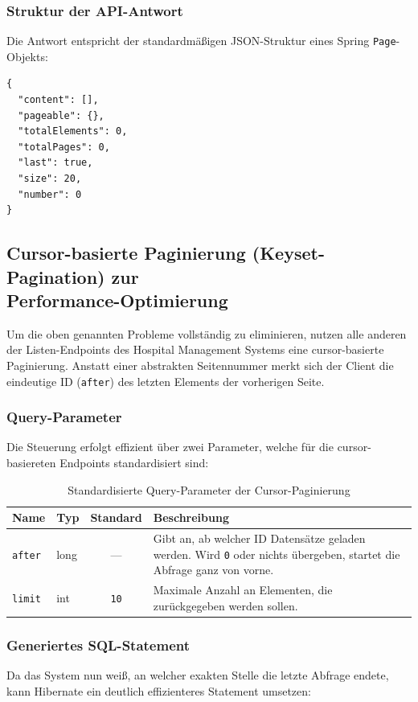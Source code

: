 \subsubsection*{Struktur der API-Antwort}
Die Antwort entspricht der standardmäßigen JSON-Struktur eines Spring \texttt{Page}-Objekts:

\begin{lstlisting}[language={}]
{
  "content": [],
  "pageable": {},
  "totalElements": 0,
  "totalPages": 0,
  "last": true,
  "size": 20,
  "number": 0
}
\end{lstlisting}


\subsection{Cursor-basierte Paginierung (Keyset-Pagination) zur \\Performance-Optimierung}
Um die oben genannten Probleme vollständig zu eliminieren, nutzen alle anderen der Listen-Endpoints des Hospital Management Systems eine cursor-basierte Paginierung. 
Anstatt einer abstrakten Seitennummer merkt sich der Client die eindeutige ID (\texttt{after}) des letzten Elements der vorherigen Seite.

\subsubsection*{Query-Parameter}
Die Steuerung erfolgt effizient über zwei Parameter, welche für die cursor-basiereten Endpoints standardisiert sind:

\begin{table}[H]
\centering
\small
\begin{tabularx}{\textwidth}{|l|l|c|X|}
\hline
\textbf{Name} & \textbf{Typ} & \textbf{Standard} & \textbf{Beschreibung} \\ \hline
\texttt{after} & long & — & Gibt an, ab welcher ID Datensätze geladen werden. Wird \texttt{0} oder nichts übergeben, startet die Abfrage ganz von vorne. \\ \hline
\texttt{limit} & int & \texttt{10} & Maximale Anzahl an Elementen, die zurückgegeben werden sollen. \\ \hline
\end{tabularx}
\caption{Standardisierte Query-Parameter der Cursor-Paginierung}
\end{table}

\subsubsection*{Generiertes SQL-Statement}
Da das System nun weiß, an welcher exakten Stelle die letzte Abfrage endete, kann Hibernate ein deutlich effizienteres Statement umsetzen:

